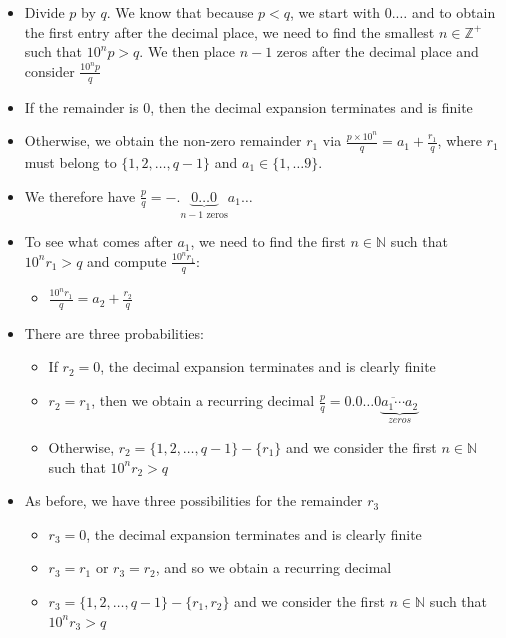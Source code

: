 \documentclass{article}
\begin{document}
\begin{itemize}
\begin{itemize}
        \item Divide $p$ by $q$. We know that because $p < q$, we start with $0.\dots$ and to obtain the first entry after the decimal place, we need to find the smallest $n \in \mathbb{Z}^+$ such that $10^n p > q$. We then place $n-1$ zeros after the decimal place and consider $\frac{10^n p}{q}$
        \item If the remainder is 0, then the decimal expansion terminates and is finite
        \item Otherwise, we obtain the non-zero remainder $r_1$ via $\frac{p \times 10^n}{q} = a_1 + \frac{r_1}{q}$, where $r_1$ must belong to $\{1,2,\dots,q-1\}$ and $a_1 \in \{1, \dots 9\}$.
        \item We therefore have $\frac{p}{q} = -. \underset{{n-1 \text{ zeros}}}{\underbrace{0 \dots 0}} a_1 \dots$
        \item To see what comes after $a_1$, we need to find the first $n \in \mathbb{N}$ such that $10^n r_1 > q$ and compute $\frac{10^n r_1}{q}$:
        \begin{itemize}
            \item $\frac{10^n r_1}{q} = a_2 + \frac{r_2}{q}$
        \end{itemize}
        \item There are three probabilities:
        \begin{itemize}
            \item If $r_2=0$, the decimal expansion terminates and is clearly finite
            \item $r_2=r_1$, then we obtain a recurring decimal $\frac{p}{q} = 0.0 \dots 0\underset{zeros}{\underbrace{\overline{a_1 \cdots} a_2}}$
            \item Otherwise, $r_2 = \{1,2, \dots, q-1\} - \{r_1\}$ and we consider the first $n \in \mathbb{N}$ such that $10^n r_2 > q$
        \end{itemize}
        \item As before, we have three possibilities for the remainder $r_3$
        \begin{itemize}
            \item $r_3 =0$, the decimal expansion terminates and is clearly finite
            \item $r_3=r_1$ or $r_3 = r_2$, and so we obtain a recurring decimal
            \item $r_3 = \{1,2,\dots,q-1\}-\{r_1,r_2\}$ and we consider the first $n \in \mathbb{N}$ such that $10^n r_3 >q$
        \end{itemize}

\end{itemize}
\end{itemize}
\end{document}
